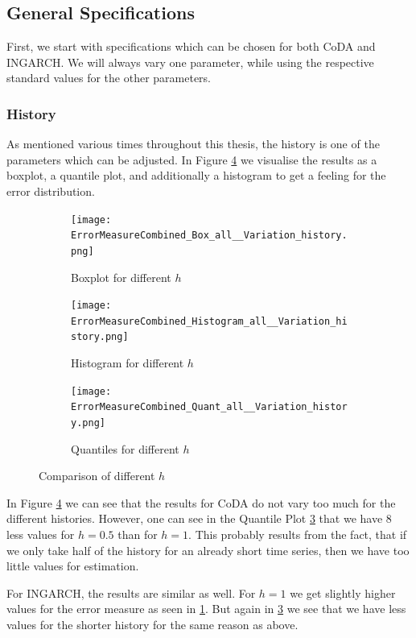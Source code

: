 \subsection{General Specifications}
\label{sec:General Specifications}

First, we start with specifications which can be chosen for both CoDA and INGARCH. We will always vary one parameter, while using the respective standard values for the other parameters. 
\subsubsection{History}
\label{sec:History}

As mentioned various times throughout this thesis, the history is one of the parameters which can be adjusted. In Figure \ref{fig:History Comp1} we visualise the results as a boxplot, a quantile plot, and additionally a histogram to get a feeling for the error distribution. 

\begin{figure}[htb!]
\centering
\begin{subfigure}[b]{0.4\textwidth}
\texttt{[image: ErrorMeasureCombined\_Box\_all\_\_Variation\_history.png]}
\caption{Boxplot for different $h$}
\label{fig:History Box}
\end{subfigure}
\hfill
\begin{subfigure}[b]{0.4\textwidth}
\texttt{[image: ErrorMeasureCombined\_Histogram\_all\_\_Variation\_history.png]}
\caption{Histogram for different $h$}
\label{fig:History Hist}
\end{subfigure}
\hfill
\begin{subfigure}[b]{0.6\textwidth}
\texttt{[image: ErrorMeasureCombined\_Quant\_all\_\_Variation\_history.png]}
\caption{Quantiles for different $h$}
\label{fig:History Quant}
\end{subfigure}
\caption{Comparison of different $h$}
\label{fig:History Comp1}
\end{figure}

In Figure \ref{fig:History Comp1} we can see that the results for CoDA do not vary too much for the different histories. However, one can see in the Quantile Plot \ref{fig:History Quant} that we have 8 less values for  $h=0.5$ than for $h=1$. This probably results from the fact, that if we only take half of the history for an already short time series, then we have too little values for estimation. 

For INGARCH, the results are similar as well. For $h=1$ we get slightly higher values for the error measure as seen in \ref{fig:History Box}. But again in \ref{fig:History Quant} we see that we have less values for the shorter history for the same reason as above. 

